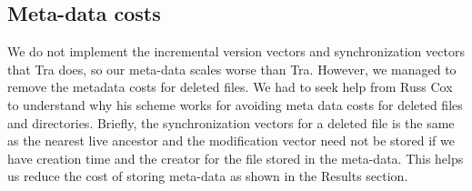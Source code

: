 \subsection{Meta-data costs}
We do not implement the incremental version vectors and synchronization vectors that Tra does, so our meta-data scales worse than Tra. However, we managed to remove the metadata costs for deleted files. We had to seek help from Russ Cox to understand why his scheme works for avoiding meta data costs for deleted files and directories. Briefly, the synchronization vectors for a deleted file is the same as the nearest live ancestor and the modification vector need not be stored if we have creation time and the creator for the file stored in the meta-data. This helps us reduce the cost of storing meta-data as shown in the Results section.

